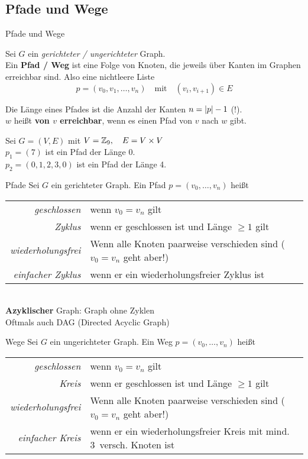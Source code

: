 \subsection{Pfade und Wege}
\begin{frame}{Pfade und Wege}
	\begin{Definition}
		Sei $G$ ein \emph{gerichteter / ungerichteter} Graph.\\
		Ein \textbf{Pfad / Weg} ist eine Folge von Knoten, die jeweils über Kanten im Graphen erreichbar sind. Also eine \alert{nichtleere} Liste $$p = (v_0, v_1, \dots, v_n) \quad \text{mit} \quad (v_i, v_{i+1}) \in E$$
	\end{Definition}
	\pause
	Die Länge eines Pfades ist die Anzahl der Kanten \quad $n = \left\lvert p \right\rvert - 1$ \; (!). \\
	\smallskip
	$w$ heißt \textbf{von $v$ erreichbar}, wenn es einen Pfad von $v$ nach $w$ gibt.
	\begin{Beispiel}
		Sei $G = (V, E)$ mit $V = \mathbb{Z}_9, \quad E = V \times V$\\ \pause
		$p_1 = (7)$ ist ein Pfad der Länge 0.\\
		$p_2 = (0, 1, 2, 3, 0)$ ist ein Pfad der Länge 4.
	\end{Beispiel}
\end{frame}

\begin{frame}[t]{Pfade}
	Sei $G$ ein gerichteter Graph. Ein Pfad $p = (v_0, \dots, v_n)$ heißt
	\begin{tabular}{>{\itshape}rp{}}
		geschlossen & wenn $v_0 = v_n$ gilt  \\
		Zyklus & wenn er geschlossen ist und Länge $\geq 1$ gilt \\
		wiederholungsfrei & Wenn alle Knoten paarweise verschieden sind \newline ($v_0 = v_n$ geht aber!) \\
		einfacher Zyklus &  wenn er ein wiederholungsfreier Zyklus ist  \\
	\end{tabular}
	\medskip \\
	\textbf{Azyklischer} Graph: Graph ohne Zyklen\\
	\impl Oftmals auch DAG (Directed Acyclic Graph)
\end{frame}

\begin{frame}[t]{Wege}
	Sei $G$ ein \alert{un}gerichteter Graph. Ein \alert{Weg} $p = (v_0, \dots, v_n)$ heißt
	\begin{tabular}{>{\itshape}rp{}}
		geschlossen & wenn $v_0 = v_n$ gilt  \\
		\alert{Kreis} & wenn er geschlossen ist und Länge $\geq 1$ gilt \\
		wiederholungsfrei & Wenn alle Knoten paarweise verschieden sind \newline ($v_0 = v_n$ geht aber!) \\
		einfacher \alert{Kreis} &  wenn er ein wiederholungsfreier Kreis \alert{mit mind. 3~versch. Knoten} ist  \\
	\end{tabular}

\end{frame}

